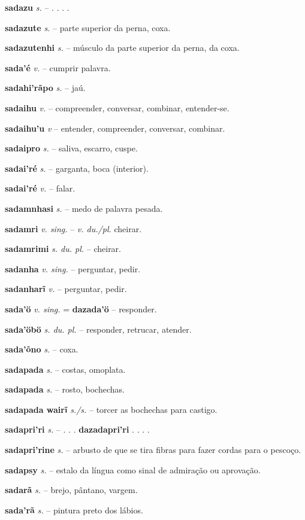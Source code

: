 \textbf{sadazu} \textit{s.} -- . . . .

\textbf{sadazute} \textit{s.} -- parte superior da perna, coxa.

\textbf{sadazutenhi} \textit{s.} -- músculo da parte superior da perna, da coxa.

\textbf{sada'é} \textit{v.} -- cumprir palavra.

\textbf{sadahi'rãpo} \textit{s.} -- jaú.

\textbf{sadaihu} \textit{v.} -- compreender, conversar, combinar, entender-se.

\textbf{sadaihu'u} \textit{v} -- entender, compreender, conversar, combinar.

\textbf{sadaipro} \textit{s.} -- saliva, escarro, cuspe.

\textbf{sadai'ré} \textit{s.} -- garganta, boca (interior).

\textbf{sadai'ré} \textit{v.} -- falar.

\textbf{sadamnhasi} \textit{s.} -- medo de palavra pesada.

\textbf{sadamri} \textit{v. sing.} -- \textit{v. du./pl.} cheirar.

\textbf{sadamrimi} \textit{s. du. pl.} -- cheirar.

\textbf{sadanha} \textit{v. sing.} -- perguntar, pedir.

\textbf{sadanharĩ} \textit{v.} -- perguntar, pedir.

\textbf{sada'ö} \textit{v. sing.} = \textbf{dazada'ö} -- responder.

\textbf{sada'öbö} \textit{s. du. pl.} -- responder, retrucar, atender.

\textbf{sada'õno} \textit{s.} -- coxa.

\textbf{sadapada} \textit{s.} -- costas, omoplata.

\textbf{sadapada} \textit{s.} -- rosto, bochechas.

\textbf{sadapada wairĩ} \textit{s./s.} -- torcer as bochechas para castigo.

\textbf{sadapri'ri} \textit{s.} -- . . . \textbf{dazadapri'ri} . . . .

\textbf{sadapri'rine} \textit{s.} -- arbusto de que se tira fibras para fazer cordas para o pescoço.

\textbf{sadapsy} \textit{s.} -- estalo da língua como sinal de admiração ou aprovação.

\textbf{sadarã} \textit{s.} -- brejo, pântano, vargem.

\textbf{sada'rã} \textit{s.} -- pintura preto dos lábios.

